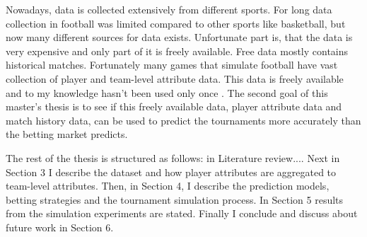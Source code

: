 Nowadays, data is collected extensively from different sports. For long data collection in football was limited compared to other sports like basketball, but now many different sources for data exists. Unfortunate part is, that the data is very expensive and only part of it is freely available. Free data mostly contains historical matches. Fortunately many games that simulate football have vast collection of player and team-level attribute data. This data is freely available and to my knowledge hasn't been used only once \cite{shin2014novel}. The second goal of this master's thesis is to see if this freely available data, player attribute data and match history data, can be used to predict the tournaments more accurately than the betting market predicts.

The rest of the thesis is structured as follows: in Literature review.... Next in Section 3 I describe the dataset and how player attributes are aggregated to team-level attributes. Then, in Section 4, I describe the prediction models, betting strategies and the tournament simulation process. In Section 5 results from the simulation experiments are stated. Finally I conclude and discuss about future work in Section 6.